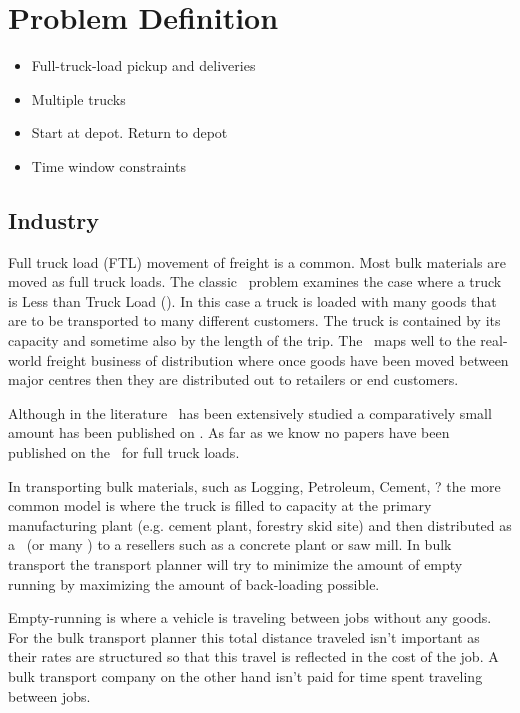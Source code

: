 
\chapter{Problem Definition}
\label{chap:pd}

\begin{itemize}
	\item Full-truck-load pickup and deliveries
	\item Multiple trucks
	\item Start at depot. Return to depot
	\item Time window constraints
\end{itemize}

\section{Industry}
Full truck load (FTL) movement of freight is a common. Most bulk materials are moved as full truck loads. The classic \VRP\ problem examines the case where a truck is Less than Truck Load (\LTL). In this case a truck is loaded with many goods that are to be transported to many different customers. The truck is contained by its capacity and sometime also by the length of the trip. The \VRP\ maps well to the real-world freight business of distribution where once goods have been moved between major centres then they are distributed out to retailers or end customers.

Although in the literature \VRP\ has been extensively studied a comparatively small amount has been published on \PDP. As far as we know no papers have been published on the \PDP\ for full truck loads.     

In transporting bulk materials, such as Logging, Petroleum, Cement, ? the more common model is where the truck is filled to capacity at the primary manufacturing plant (e.g. cement plant, forestry skid site) and then distributed as a \FTL\ (or many \FTL) to a resellers such as a concrete plant or saw mill. In bulk transport the transport planner will try to minimize the amount of empty running by maximizing the amount of back-loading possible.

Empty-running is where a vehicle is traveling between jobs without any goods. For the bulk transport planner this total distance traveled isn't important as their rates are structured so that this travel is reflected in the cost of the job. A bulk transport company on the other hand isn't paid for time spent traveling between jobs.

